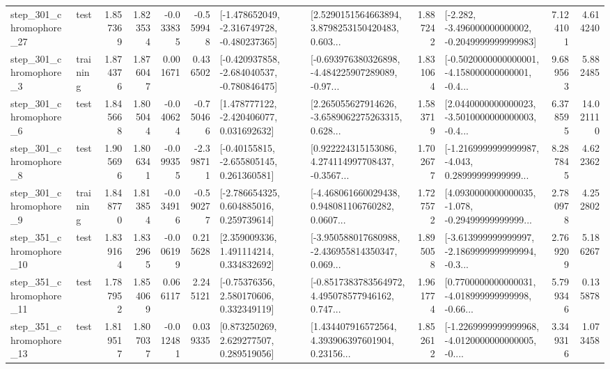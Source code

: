 \begin{tabular}{llrrrrllrlrr}
  step\_301\_chromophore\_27 &      test &      1.857369 &    1.823534 &     -0.033835 & -0.559948 &  [-1.478652049, -2.316749728, -0.480237365] &  [2.5290151564663894, 3.8798253150420483, 0.603... &       1.887242 &  [-2.282, -3.496000000000002, -0.2049999999999983] &            7.124101 &          4.614240 \\
   step\_301\_chromophore\_3 &  training &      1.874376 &    1.876047 &      0.001671 &  0.436502 &  [-0.420937858, -2.684040537, -0.780846475] &  [-0.693976380326898, -4.484225907289089, -0.97... &       1.831064 &  [-0.5020000000000001, -4.158000000000001, -0.4... &            9.689563 &          5.882485 \\
   step\_301\_chromophore\_6 &      test &      1.845668 &    1.805044 &     -0.040624 & -0.750466 &    [1.478777122, -2.420406077, 0.031692632] &  [2.265055627914626, -3.6589062275263315, 0.628... &       1.583719 &  [2.0440000000000023, -3.5010000000000003, -0.4... &            6.378595 &         14.021110 \\
   step\_301\_chromophore\_8 &      test &      1.905696 &    1.806341 &     -0.099355 & -2.398711 &    [-0.40155815, -2.655805145, 0.261360581] &  [0.922224315153086, 4.274114997708437, -0.3567... &       1.702677 &  [-1.2169999999999987, -4.043, 0.28999999999999... &            8.287845 &          4.622362 \\
   step\_301\_chromophore\_9 &  training &      1.848770 &    1.813854 &     -0.034916 & -0.590277 &    [-2.786654325, 0.604885016, 0.259739614] &  [-4.468061660029438, 0.948081106760282, 0.0607... &       1.727572 &  [4.0930000000000035, -1.078, -0.29499999999999... &            2.780978 &          4.252802 \\
  step\_351\_chromophore\_10 &      test &      1.839164 &    1.832965 &     -0.006199 &  0.215628 &     [2.359009336, 1.491114214, 0.334832692] &  [-3.950588017680988, -2.436955814350347, 0.069... &       1.895058 &  [-3.613999999999997, -2.1869999999999994, -0.3... &            2.769209 &          5.186267 \\
  step\_351\_chromophore\_11 &      test &      1.787952 &    1.854069 &      0.066117 &  2.245121 &     [-0.75376356, 2.580170606, 0.332349119] &  [-0.8517383783564972, 4.495078577946162, 0.747... &       1.961774 &  [0.7700000000000031, -4.018999999999998, -0.66... &            5.799346 &          0.135878 \\
  step\_351\_chromophore\_13 &      test &      1.819517 &    1.807037 &     -0.012481 &  0.039335 &     [0.873250269, 2.629277507, 0.289519056] &  [1.434407916572564, 4.393906397601904, 0.23156... &       1.852612 &  [-1.2269999999999968, -4.0120000000000005, -0.... &            3.349316 &          1.073458 \\

\end{tabular}
